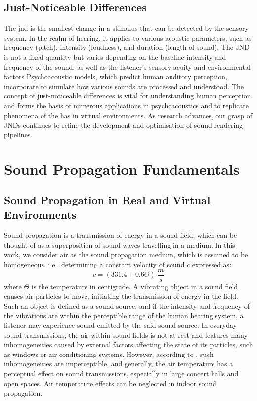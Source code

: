 \subsection{Just-Noticeable Differences}
The \acrfull{jnd} is the smallest change in a stimulus that can be detected by the sensory system. In the realm of hearing, it applies to various acoustic parameters, such as frequency (pitch), intensity (loudness), and duration (length of sound). The JND is not a fixed quantity but varies depending on the baseline intensity and frequency of the sound, as well as the listener's sensory acuity and environmental factors \citep{dolhasz2021perceptually}
Psychoacoustic models, which predict human auditory perception, incorporate  to simulate how various sounds are processed and understood.  The concept of just-noticeable differences is vital for understanding human perception and forms the basis of numerous applications in psychoacoustics and to replicate phenomena of the \acrshort{has} in virtual environments. As research advances, our grasp of JNDs continues to refine the development and optimisation of sound rendering pipelines.

\section{Sound Propagation Fundamentals}
\subsection{Sound Propagation in Real and Virtual Environments}
Sound propagation is a transmission of energy in a sound field, which can be thought of as a superposition of sound waves travelling in a medium. In this work, we consider air as the sound propagation medium, which is assumed to be homogeneous, i.e., determining a constant velocity of sound $c$ expressed as: 
\begin{equation}
c = (331.4 + 0.6\Theta)~\frac{m}{s}   
\end{equation}
where $\Theta$ is the temperature in centigrade.
A vibrating object in a sound field causes air particles to move, initiating the transmission of energy in the field. Such an object is defined as a sound source, and if the intensity and frequency of the vibrations are within the perceptible range of the human hearing system, a listener may experience sound emitted by the said sound source.
In everyday sound transmissions, the air within sound fields is not at rest and features many inhomogeneities caused by external factors affecting the state of its particles, such as windows or air conditioning systems. However, according to \citep{kuttruff2016room}, such inhomogeneities are imperceptible, and generally, the air temperature has a perceptual effect on sound transmissions, especially in large concert halls and open spaces. Air temperature effects can be neglected in indoor sound propagation.

